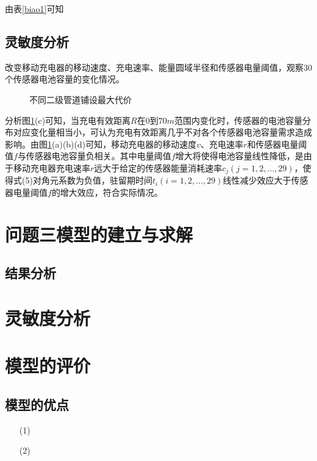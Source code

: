 \documentclass{whutmod}
\begin{document}
		由表\ref{biao1}可知
		
        \subsection{灵敏度分析}

		改变移动充电器的移动速度、充电速率、能量圆域半径和传感器电量阈值，观察$30$个传感器电池容量的变化情况。
		
	\begin{figure}[H]
		\centering
	\end{figure}	
	\begin{figure}[H]
		\centering
		\caption{不同二级管道铺设最大代价}
		\label{mgh}
	\end{figure}
		分析图\ref{mgh}(c)可知，当充电有效距离$R$在$0$到$70m$范围内变化时，传感器的电池容量分布对应变化量相当小，可认为充电有效距离几乎不对各个传感器电池容量需求造成影响。由图\ref{mgh}(a)(b)(d)可知，移动充电器的移动速度$v$、充电速率$r$和传感器电量阈值$f$与传感器电池容量负相关。其中电量阈值$f$增大将使得电池容量线性降低，是由于移动充电器充电速率$r$远大于给定的传感器能量消耗速率$c_j(j=1,2,...,29)$，使得式(5)对角元系数为负值，驻留期时间$t_i(i=1,2,...,29)$线性减少效应大于传感器电量阈值$f$的增大效应，符合实际情况。
    \section{问题三模型的建立与求解}
  		\subsection{结果分析}
  
  	\section{灵敏度分析}
 
  	\section{模型的评价}
		\subsection{模型的优点}
			\begin{itemize}                                             
			\item [(1)]
			\item [(2)] 	
			\end{itemize}
\end{document}
